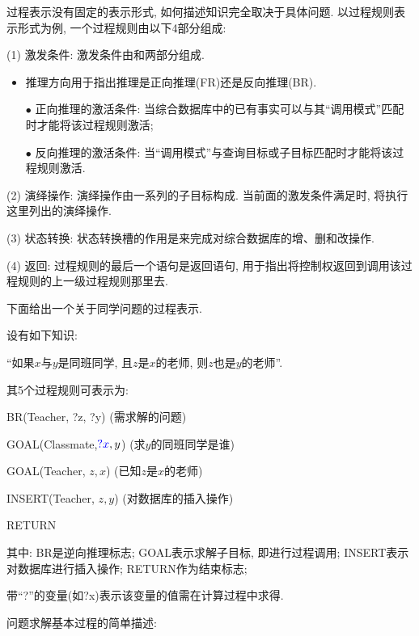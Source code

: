 过程表示没有固定的表示形式, 如何描述知识完全取决于具体问题. 以过程规则表示形式为例, 一个过程规则由以下4部分组成:

(1) 激发条件: 激发条件由和两部分组成.
\begin{itemize}
\item 推理方向用于指出推理是正向推理(FR)还是反向推理(BR).

    $\bullet$ 正向推理的激活条件: 当综合数据库中的已有事实可以与其“调用模式”匹配时才能将该过程规则激活;

    $\bullet$ 反向推理的激活条件: 当“调用模式”与查询目标或子目标匹配时才能将该过程规则激活.
\end{itemize}

(2) 演绎操作: 演绎操作由一系列的子目标构成. 当前面的激发条件满足时, 将执行这里列出的演绎操作.

(3) 状态转换: 状态转换槽的作用是来完成对综合数据库的增、删和改操作.

(4) 返回: 过程规则的最后一个语句是返回语句, 用于指出将控制权返回到调用该过程规则的上一级过程规则那里去.
\begin{example}
下面给出一个关于同学问题的过程表示.

     设有如下知识:
    \begin{center}
        “如果$x$与$y$是同班同学, 且$z$是$x$的老师,  则$z$也是$y$的老师”.
    \end{center}

    其5个过程规则可表示为:

        \quad{} BR(Teacher, \textcolor[rgb]{0,0,1}{?z, ?y})          (需求解的问题)

        \quad{} GOAL(Classmate,$\textcolor[rgb]{0,0,1}{?x}, y$)     (求$y$的同班同学是谁)

        \quad{} GOAL(Teacher, $z, x$)        (已知$z$是$x$的老师)

        \quad{} INSERT(Teacher,  $z, y$)     (对数据库的插入操作)

        \quad{} \textcolor[rgb]{1,0,1}{RETURN}

其中: BR是逆向推理标志; GOAL表示求解子目标, 即进行过程调用; INSERT表示对数据库进行插入操作; RETURN作为结束标志;

\begin{remark}
    带“?”的变量(如?x)表示该变量的值需在计算过程中求得.
\end{remark}
\end{example}
问题求解基本过程的简单描述:

